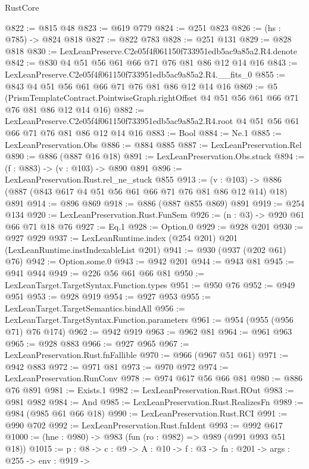 \begin{lexlean}{RustCore}
\begin{coremodule}
@822 := @815 @48
@823 := @619 @779
@824 := @251 @823
@826 := (hs : @785) -> @824 @818
@827 := @822 @783
@828 := @251 @131
@829 := @828 @818
@830 := LexLeanPreserve.C2e05f4f061150f733951edb5ac9a85a2.R4.denote
@842 := @830 @4 @51 @56 @61 @66 @71 @76 @81 @86 @12 @14 @16
@843 := LexLeanPreserve.C2e05f4f061150f733951edb5ac9a85a2.R4.__fits_0
@855 := @843 @4 @51 @56 @61 @66 @71 @76 @81 @86 @12 @14 @16
@869 := @5
    (PrismTemplateContract.PointwiseGraph.rightOffset
      @4
      @51
      @56
      @61
      @66
      @71
      @76
      @81
      @86
      @12
      @14
      @16)
@882 := LexLeanPreserve.C2e05f4f061150f733951edb5ac9a85a2.R4.root
    @4
    @51
    @56
    @61
    @66
    @71
    @76
    @81
    @86
    @12
    @14
    @16
@883 := Bool
@884 := Ne.{1}
@885 := LexLeanPreservation.Obs
@886 := @884 @885
@887 := LexLeanPreservation.Rel
@890 := @886 (@887 @16 @18)
@891 := LexLeanPreservation.Obs.stuck
@894 := (f : @883) -> (v : @103) -> @890 @891
@896 := LexLeanPreservation.Rust.rel_ne_stuck @855
@913 := (v : @103) -> @886 (@887 (@843 @617 @4 @51 @56 @61 @66 @71 @76 @81 @86 @12 @14) @18) @891
@914 := @896 @869
@918 := @886 (@887 @855 @869) @891
@919 := @254 @134
@920 := LexLeanPreservation.Rust.FunSem
@926 := (n : @3) -> @920 @61 @66 @71 @18 @76
@927 := Eq.{1}
@928 := Option.{0}
@929 := @928 @201
@930 := @927 @929
@937 := LexLeanRuntime.index (@254 @201) @201 (LexLeanRuntime.instIndexableList @201)
@941 := @930 (@937 (@202 @61) @76)
@942 := Option.some.{0}
@943 := @942 @201
@944 := @943 @81
@945 := @941 @944
@949 := @226 @56 @61 @66 @81
@950 := LexLeanTarget.TargetSyntax.Function.types
@951 := @950 @76
@952 := @949 @951
@953 := @928 @919
@954 := @927 @953
@955 := LexLeanTarget.TargetSemantics.bindAll
@956 := LexLeanTarget.TargetSyntax.Function.parameters
@961 := @954 (@955 (@956 @71) @76 @174)
@962 := @942 @919
@963 := @962 @81
@964 := @961 @963
@965 := @928 @883
@966 := @927 @965
@967 := LexLeanPreservation.Rust.fnFallible
@970 := @966 (@967 @51 @61)
@971 := @942 @883
@972 := @971 @81
@973 := @970 @972
@974 := LexLeanPreservation.RunConv
@978 := @974 @617 @56 @66 @81
@980 := @886 @76 @891
@981 := Exists.{1}
@982 := LexLeanPreservation.Rust.ROut
@983 := @981 @982
@984 := And
@985 := LexLeanPreservation.Rust.RealizesFn
@989 := @984 (@985 @61 @66 @18)
@990 := LexLeanPreservation.Rust.RCI
@991 := @990 @702
@992 := LexLeanPreservation.Rust.fnIdent
@993 := @992 @617
@1000 := (hne : @980) -> @983 (fun (ro : @982) => @989 (@991 @993 @51 @18))
@1015 := {p : @8} ->
  {c : @9} ->
  {A : @10} ->
  {f : @3} ->
  {fn : @201} ->
  {args : @255} ->
  {env : @919} ->

\end{coremodule}
\end{lexlean}

